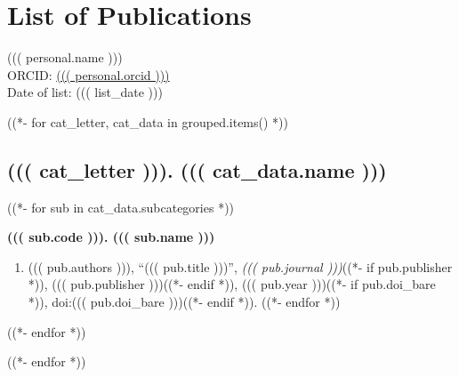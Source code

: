 \documentclass[a4paper,12pt]{article}
\begin{document}
\section*{List of Publications}

((( personal.name ))) \\
ORCID: \href{https://orcid.org/((( personal.orcid )))}{((( personal.orcid )))} \\
Date of list: ((( list_date )))

((*- for cat_letter, cat_data in grouped.items() *))

\subsection*{((( cat_letter ))). ((( cat_data.name )))}

((*- for sub in cat_data.subcategories *))

\textbf{((( sub.code ))). ((( sub.name )))}
\begin{enumerate}
((*- for pub in sub.publications *))
\item ((( pub.authors ))), ``((( pub.title )))'', \textit{((( pub.journal )))}((*- if pub.publisher *)), ((( pub.publisher )))((*- endif *)), ((( pub.year )))((*- if pub.doi_bare *)), doi:((( pub.doi_bare )))((*- endif *)).
((*- endfor *))
\end{enumerate}
((*- endfor *))

((*- endfor *))

\label{lastpage}
\end{document}
